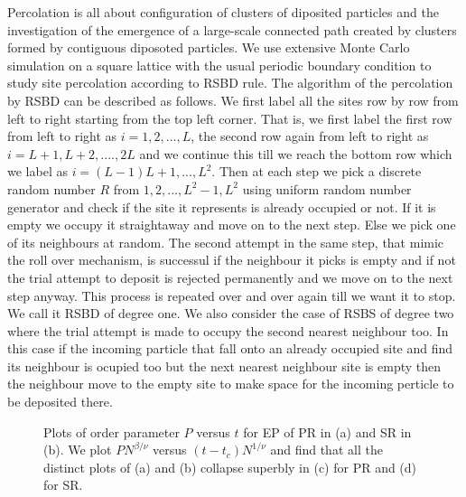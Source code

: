 ﻿\documentclass[twocolumn,showpacs,preprintnumbers,amsmath,amssymb]{revtex4}
\begin{document}
Percolation is all about configuration of clusters of diposited particles and the investigation of the emergence 
of a large-scale connected path created by clusters formed by contiguous diposoted particles.
We use extensive Monte Carlo simulation on a square lattice with the usual periodic boundary condition
to study site percolation according to RSBD rule.
The algorithm of the percolation by RSBD can be described as follows. We first label all the sites
row by row from left to right starting from the top left corner. That is, we first label the first row from
left to right as $i=1,2,...,L$, the second row again from left to right as $i=L+1,L+2,....,2L$
and we continue this till we reach the bottom row which we label as $i=(L-1)L+1,...,L^2$. 
Then at each step we pick a discrete random number $R$ from $1,2,...,L^2-1,L^2$ using uniform random number
 generator and check if the site it represents is already occupied or not. If it is
empty we occupy it straightaway and move on to the next step. Else we pick one of its neighbours at random. 
The second attempt in the same step, that mimic the roll over mechanism, is successul if the neighbour
it picks is empty and if not the trial attempt to deposit is rejected permanently and we move on to the next 
step anyway. This process is
repeated over and over again till we want it to stop. We call it RSBD of degree one. We also consider
the case of RSBS of degree two where the trial attempt is made to occupy the second nearest neighbour too.
In this case if the incoming particle that fall onto an already occupied site and find its 
neighbour is ocupied too but the next nearest neighbour site is empty then the neighbour move to the empty
site to make space for the incoming perticle to be deposited there. 






\begin{figure}

\centering


\caption{Plots of order parameter $P$ versus $t$ for EP of PR in (a) and SR in (b). We plot $PN^{\beta/\nu}$ versus $(t-t_c)N^{1/\nu}$ and
find that all the distinct plots of (a) and (b) collapse superbly in (c) for PR and (d) for SR.
} 

\label{fig:1ab}

\end{figure}
\end{document}
